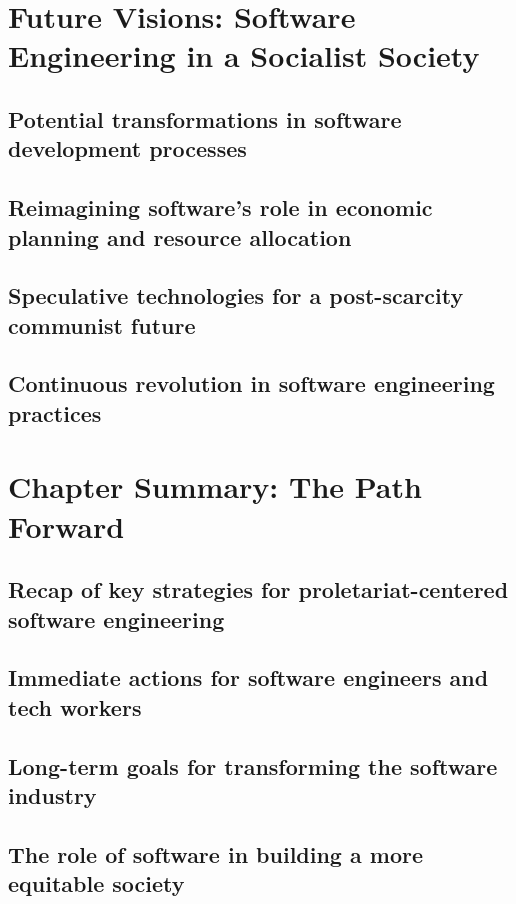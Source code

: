 \newpage

\section{Future Visions: Software Engineering in a Socialist Society}
\subsection{Potential transformations in software development processes}
\subsection{Reimagining software's role in economic planning and resource allocation}
\subsection{Speculative technologies for a post-scarcity communist future}
\subsection{Continuous revolution in software engineering practices}

\newpage

\section{Chapter Summary: The Path Forward}
\subsection{Recap of key strategies for proletariat-centered software engineering}
\subsection{Immediate actions for software engineers and tech workers}
\subsection{Long-term goals for transforming the software industry}
\subsection{The role of software in building a more equitable society}